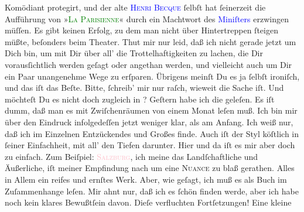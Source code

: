                Komödiant protegirt, und  der alte \textsc{\textcolor{blue}{Henri Becque}{}\ledrightnote{\textcolor{blue}{Henri Becque}}} ſelbſt hat ſeinerzeit die Aufführung von »\textsc{\textcolor{green}{La Parisienne}{}\ledrightnote{\textcolor{green}{La Parisienne}}}« durch ein
               Machtwort des \textcolor{blue}{Miniſters}{}
               erzwingen müſſen. Es gibt keinen Erfolg, zu dem man nicht über Hintertreppen ſteigen
               müßte, beſonders beim Theater. Thut mir nur leid, daß ich nicht gerade jetzt um Dich
               bin, um {\pb}mit Dir über all’ die Trottelhaftigkeiten
               zu lachen, die Dir vorausſichtlich werden geſagt oder angethan werden, und vielleicht
               auch um Dir ein Paar unangenehme Wege zu erſparen. Übrigens meinſt Du es ja ſelbſt
               ironiſch, und das iſt das Beſte. Bitte, ſchreib’ mir nur raſch, wieweit die Sache
               iſt. Und möchteſt Du es nicht doch zugleich in \label{K_L02620-3v}\label{K_L02620-3h}?\pend
           \pstart
           Geſtern habe ich die \label{K_L02620-2v}\label{K_L02620-2h} geleſen. Es iſt dumm, daß man es mit
               Zwiſchenräumen  von einem Monat leſen muß. Ich bin
               mir über den Eindruck infolgedeſſen jetzt weniger {\pb}klar, als am Anfang. Ich weiß nur, daß ich im Einzelnen Entzückendes und Großes
               finde. Auch iſt der Styl köſtlich in ſeiner Einfachheit, mit all’ den Tiefen
               darunter.  Hier und da iſt es mir aber doch zu einfach. Zum Beiſpiel:
                  \textsc{\textcolor{pink}{Salzburg}{}\ledrightnote{\textcolor{pink}{Salzburg}}}, ich meine das
               Landſchaftliche und Äußerliche, iſt meiner Empfindung nach um eine \textsc{Nuance} zu blaß gerathen. Alles in Allem ein reifes und
               ernſtes Werk. Aber, wie geſagt, ich muß es als Buch im Zuſammenhange leſen. Mir ahnt
               nur, daß ich es ſchön finden werde, {\pb}aber ich habe
               noch kein klares Bewußtſein davon. Dieſe verfluchten Fortſetzungen! Eine kleine

